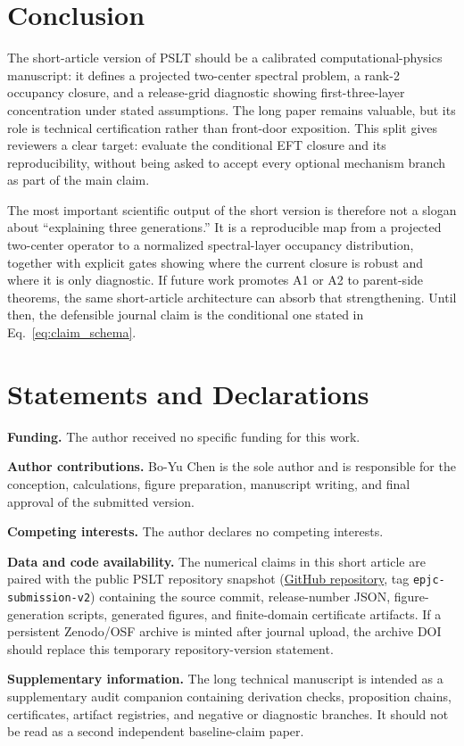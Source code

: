 \documentclass[pdflatex,sn-mathphys-num,iicol]{sn-jnl}
\begin{document}
\section{Conclusion}
\label{sec:conclusion}

The short-article version of PSLT should be a calibrated computational-physics manuscript: it defines a projected two-center spectral problem, a rank-2 occupancy closure, and a release-grid diagnostic showing first-three-layer concentration under stated assumptions.
The long paper remains valuable, but its role is technical certification rather than front-door exposition.
This split gives reviewers a clear target: evaluate the conditional EFT closure and its reproducibility, without being asked to accept every optional mechanism branch as part of the main claim.

The most important scientific output of the short version is therefore not a slogan about ``explaining three generations.''
It is a reproducible map from a projected two-center operator to a normalized spectral-layer occupancy distribution, together with explicit gates showing where the current closure is robust and where it is only diagnostic.
If future work promotes A1 or A2 to parent-side theorems, the same short-article architecture can absorb that strengthening.
Until then, the defensible journal claim is the conditional one stated in Eq.~\eqref{eq:claim_schema}.


\backmatter

\section*{Statements and Declarations}

\noindent\textbf{Funding.}
The author received no specific funding for this work.

\noindent\textbf{Author contributions.}
Bo-Yu Chen is the sole author and is responsible for the conception, calculations, figure preparation, manuscript writing, and final approval of the submitted version.

\noindent\textbf{Competing interests.}
The author declares no competing interests.

\noindent\textbf{Data and code availability.}
The numerical claims in this short article are paired with the public PSLT repository snapshot (\href{https://github.com/boypatrick/PSLT}{GitHub repository}, tag \texttt{epjc-submission-v2}) containing the source commit, release-number JSON, figure-generation scripts, generated figures, and finite-domain certificate artifacts.  If a persistent Zenodo/OSF archive is minted after journal upload, the archive DOI should replace this temporary repository-version statement.

\noindent\textbf{Supplementary information.}
The long technical manuscript is intended as a supplementary audit companion containing derivation checks, proposition chains, certificates, artifact registries, and negative or diagnostic branches.  It should not be read as a second independent baseline-claim paper.



\end{document}
